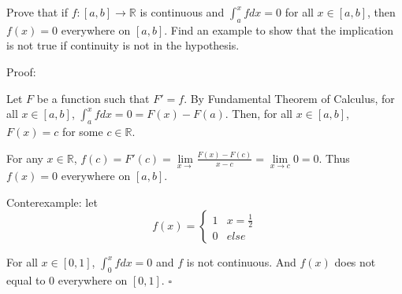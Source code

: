 \documentclass{article}
\begin{document}
Prove that if $f:[a,b]\rightarrow\mathbb{R}$ is continuous and $\int_a^x fdx=0$ for all $x\in[a,b]$, then $f(x)=0$ everywhere on $[a,b]$.  Find an example to show that the implication is not true if continuity is not in the hypothesis.


Proof:

Let $F$ be a function such that $F' = f$. By Fundamental Theorem of Calculus, for all $x \in [a,b]$, $\int_a^x fdx=0 = F(x)-F(a)$. Then, for all $x \in [a,b]$, $F(x) = c$ for some $c \in \mathbb{R}$.

For any $x \in \mathbb{R}$, $f(c) = F'(c) = \lim \limits_{x\to } \frac{F(x) - F(c)}{x-c} = \lim \limits_{x\to c} 0 = 0$. Thus $f(x) = 0$ everywhere on $[a,b]$.

Conterexample: let \[ f(x)= \begin{cases}1 & x = \frac{1}{2} \\ 0 & \textit{else} \end{cases}\]

For all $x \in [0,1]$, $\int_0^x fdx=0$ and $f$ is not continuous. And $f(x)$ does not equal to $0$ everywhere on $[0,1]$. $\square$
\end{document}
